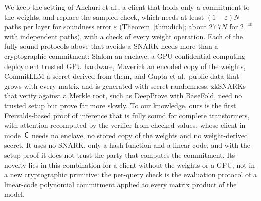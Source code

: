  We keep the setting of Anchuri et al., a client that holds only a commitment
to the weights, and replace the sampled check, which needs at least $(1-\varepsilon)N$ paths per layer
for soundness error $\varepsilon$ (Theorem~\ref{thm:dich}; about $27.7N$ for $2^{-40}$ with independent
paths), with a check of every weight operation. Each of
the fully sound protocols above that avoids a SNARK needs more than a cryptographic commitment:
Slalom an enclave, a GPU confidential-computing deployment trusted GPU hardware, Maverick an
encoded copy of the weights, CommitLLM a secret derived from them, and Gupta et al.\ public data
that grows with every matrix and is generated with secret randomness. zkSNARKs that verify against
a Merkle root, such as DeepProve with BaseFold, need no trusted setup but prove far more slowly. To
our knowledge, ours is the first Freivalds-based proof of inference that is fully sound for complete
transformers, with attention recomputed by the verifier from checked values, whose client in
mode~$\mathsf{C}$ needs no enclave, no stored copy of the weights and no weight-derived secret. It uses no
SNARK, only a hash function and a linear code, and with the setup proof it does not trust the party
that computes the commitment. Its novelty lies in this combination for a client without the
weights or a GPU, not in a new cryptographic primitive: the per-query check is the evaluation
protocol of a linear-code polynomial commitment applied to every matrix product of the model.
